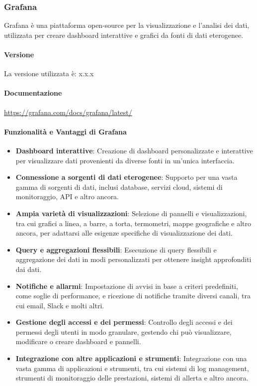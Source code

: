 \subsubsection{Grafana}
Grafana è una piattaforma open-source per la visualizzazione e l'analisi dei dati, utilizzata per creare dashboard interattive e grafici da fonti di dati eterogenee. 
\paragraph{Versione}
La versione utilizzata è: x.x.x
\paragraph{Documentazione}
\href{https://grafana.com/docs/grafana/latest/}{https://grafana.com/docs/grafana/latest/}

\paragraph{Funzionalità e Vantaggi di Grafana}
\begin{itemize}
    \item \textbf{Dashboard interattive}: Creazione di dashboard personalizzate e interattive per visualizzare dati provenienti da diverse fonti in un'unica interfaccia.
    
    \item \textbf{Connessione a sorgenti di dati eterogenee}: Supporto per una vasta gamma di sorgenti di dati, inclusi database, servizi cloud, sistemi di monitoraggio, API e altro ancora.
    
    \item \textbf{Ampia varietà di visualizzazioni}: Selezione di pannelli e visualizzazioni, tra cui grafici a linea, a barre, a torta, termometri, mappe geografiche e altro ancora, per adattarsi alle esigenze specifiche di visualizzazione dei dati.
    
    \item \textbf{Query e aggregazioni flessibili}: Esecuzione di query flessibili e aggregazione dei dati in modi personalizzati per ottenere insight approfonditi dai dati.
    
    \item \textbf{Notifiche e allarmi}: Impostazione di avvisi in base a criteri predefiniti, come soglie di performance, e ricezione di notifiche tramite diversi canali, tra cui email, Slack e molti altri.
    
    \item \textbf{Gestione degli accessi e dei permessi}: Controllo degli accessi e dei permessi degli utenti in modo granulare, gestendo chi può visualizzare, modificare o creare dashboard e pannelli.
    
    \item \textbf{Integrazione con altre applicazioni e strumenti}: Integrazione con una vasta gamma di applicazioni e strumenti, tra cui sistemi di log management, strumenti di monitoraggio delle prestazioni, sistemi di allerta e altro ancora.
    
   \end{itemize}
